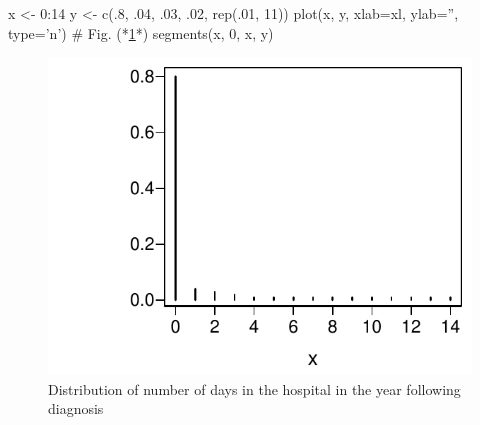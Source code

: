 \begin{Schunk}
\begin{Sinput}
x <- 0:14
y <- c(.8, .04, .03, .02, rep(.01, 11))
plot(x, y, xlab=xl, ylab='', type='n')   # Fig. (*\ref{fig:descript-orda}*)
segments(x, 0, x, y)
\end{Sinput}
\begin{figure}[htbp]

\centerline{\includegraphics[width=\maxwidth]{descript-orda-1} }

\caption[Count variable with clumping at zero]{Distribution of number of days in the hospital in the year following diagnosis}\label{fig:descript-orda}
\end{figure}
\end{Schunk}
